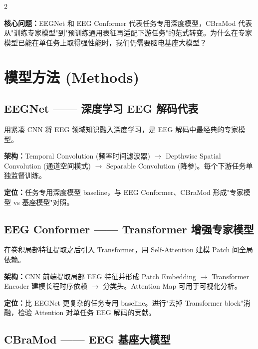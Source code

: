 \documentclass[12pt, a0paper]{article}
\begin{document}
\begin{multicols}{2}
\vspace{1em}

\textbf{核心问题：}EEGNet 和 EEG Conformer 代表任务专用深度模型，CBraMod 代表从"训练专家模型"到"预训练通用表征再适配下游任务"的范式转变。为什么在专家模型已能在单任务上取得强性能时，我们仍需要脑电基座大模型？

\section{模型方法 (Methods)}

\subsection{EEGNet —— 深度学习 EEG 解码代表}

用紧凑 CNN 将 EEG 领域知识融入深度学习，是 EEG 解码中最经典的专家模型。

\textbf{架构：}Temporal Convolution (频率时间滤波器) $\rightarrow$ Depthwise Spatial Convolution (通道空间模式) $\rightarrow$ Separable Convolution (降参)。每个下游任务单独监督训练。

\textbf{定位：}任务专用深度模型 baseline，与 EEG Conformer、CBraMod 形成"专家模型 vs 基座模型"对照。

\vspace{1em}

\subsection{EEG Conformer —— Transformer 增强专家模型}

在卷积局部特征提取之后引入 Transformer，用 Self-Attention 建模 Patch 间全局依赖。

\textbf{架构：}CNN 前端提取局部 EEG 特征并形成 Patch Embedding $\rightarrow$ Transformer Encoder 建模长程时序依赖 $\rightarrow$ 分类头。Attention Map 可用于可视化分析。

\textbf{定位：}比 EEGNet 更复杂的任务专用 baseline。进行"去掉 Transformer block"消融，检验 Attention 对单任务 EEG 解码的贡献。

\vspace{1em}

\subsection{CBraMod —— EEG 基座大模型}


\end{multicols}
\end{document}

